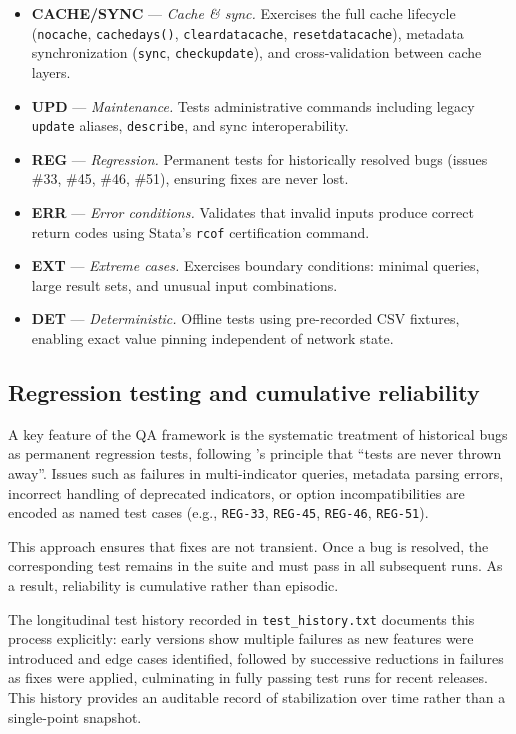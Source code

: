\documentclass[bib]{statapress}
\begin{document}
\begin{itemize}
    options: \texttt{projection}, \texttt{nobasic}, \texttt{nometadata},
    \texttt{describe}, and date handling.
  \item \textbf{CACHE/SYNC} --- \emph{Cache \& sync.}  Exercises the full cache
    lifecycle (\texttt{nocache}, \texttt{cachedays()}, \texttt{cleardatacache},
    \texttt{resetdatacache}), metadata synchronization (\texttt{sync},
    \texttt{checkupdate}), and cross-validation between cache layers.
  \item \textbf{UPD} --- \emph{Maintenance.}  Tests administrative commands
    including legacy \texttt{update} aliases, \texttt{describe}, and sync
    interoperability.
  \item \textbf{REG} --- \emph{Regression.}  Permanent tests for historically
    resolved bugs (issues \#33, \#45, \#46, \#51), ensuring fixes are never lost.
  \item \textbf{ERR} --- \emph{Error conditions.}  Validates that invalid inputs
    produce correct return codes using Stata's \texttt{rcof} certification command.
  \item \textbf{EXT} --- \emph{Extreme cases.}  Exercises boundary conditions:
    minimal queries, large result sets, and unusual input combinations.
  \item \textbf{DET} --- \emph{Deterministic.}  Offline tests using pre-recorded
    CSV fixtures, enabling exact value pinning independent of network state.
\end{itemize}

\subsection{Regression testing and cumulative reliability}

A key feature of the QA framework is the systematic treatment of historical
bugs as permanent regression tests, following \citeauthor{gould2001certification}'s
principle that ``tests are never thrown away''.
Issues such as failures in multi-indicator queries, metadata parsing errors,
incorrect handling of deprecated indicators, or option incompatibilities are
encoded as named test cases (e.g., \texttt{REG-33}, \texttt{REG-45},
\texttt{REG-46}, \texttt{REG-51}).

This approach ensures that fixes are not transient. Once a bug is resolved, the
corresponding test remains in the suite and must pass in all subsequent runs.
As a result, reliability is cumulative rather than episodic.

The longitudinal test history recorded in \texttt{test\_history.txt} documents
this process explicitly: early versions show multiple failures as new features
were introduced and edge cases identified, followed by successive reductions in
failures as fixes were applied, culminating in fully passing test runs for
recent releases. This history provides an auditable record of stabilization over
time rather than a single-point snapshot.
\end{document}
